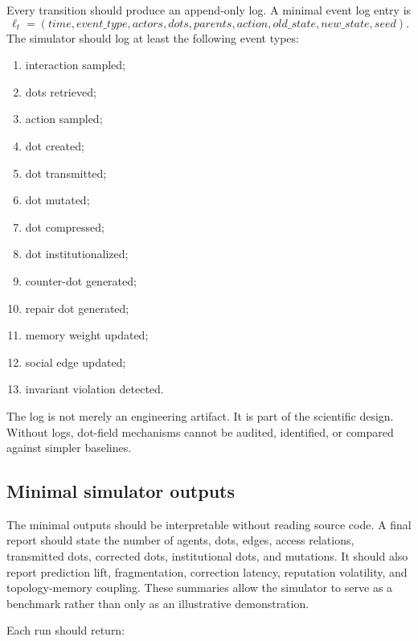 \documentclass[11pt]{article}
\theoremstyle{remark}
\begin{document}
Every transition should produce an append-only log. A minimal event log
entry is
$$
\ell_t=(time,event\_type,actors,dots,parents,action,old\_state,new\_state,seed).
$$
The simulator should log at least the following event types:

\begin{enumerate}[leftmargin=*]
\item interaction sampled;
\item dots retrieved;
\item action sampled;
\item dot created;
\item dot transmitted;
\item dot mutated;
\item dot compressed;
\item dot institutionalized;
\item counter-dot generated;
\item repair dot generated;
\item memory weight updated;
\item social edge updated;
\item invariant violation detected.
\end{enumerate}

The log is not merely an engineering artifact. It is part of the
scientific design. Without logs, dot-field mechanisms cannot be audited,
identified, or compared against simpler baselines.

\subsection{Minimal simulator outputs}\label{minimal-simulator-outputs}

The minimal outputs should be interpretable without reading source code. A final report should state the number of agents, dots, edges, access relations, transmitted dots, corrected dots, institutional dots, and mutations. It should also report prediction lift, fragmentation, correction latency, reputation volatility, and topology-memory coupling. These summaries allow the simulator to serve as a benchmark rather than only as an illustrative demonstration.


Each run should return:
\end{document}

